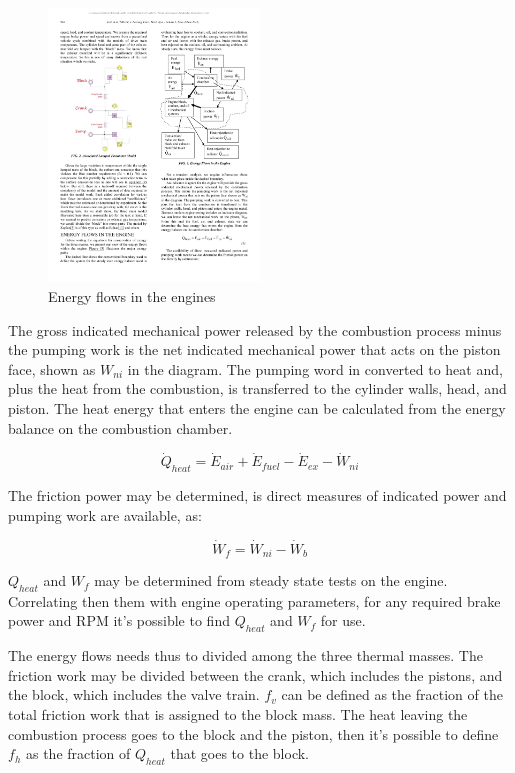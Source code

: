 \begin{figure}[ht]
  \centering
  \includegraphics[width=0.5\textwidth]{figures/model/energy_flows.pdf}
  \caption{Energy flows in the engines\label{fig:energy_flows} }
\end{figure}

The gross indicated mechanical power released by the combustion process minus the pumping work is the net indicated mechanical power that acts on the piston face, shown as $W_{ni}$ in the diagram. The pumping word in converted to heat and, plus the heat from the combustion, is transferred to the cylinder walls, head, and piston. The heat energy that enters the engine can be calculated from the energy balance on the combustion chamber.

\begin{equation}
  \dot{Q}_{heat} = \dot{E}_{air}+\dot{E}_{fuel}-\dot{E}_{ex}-\dot{W}_{ni}
\end{equation}

The friction power may be determined, is direct measures of indicated power and pumping work are available, as:

\begin{equation}
  \dot{W}_{f}=\dot{W}_{ni}-\dot{W}_{b}
\end{equation}

$Q_{heat}$ and $W_{f}$ may be determined from steady state tests on the engine. Correlating then them with engine operating parameters, for any required brake power and RPM it's possible to find $Q_{heat}$ and $W_{f}$ for use.

The energy flows needs thus to divided among the three thermal masses. The friction work may be divided between the crank, which includes the pistons, and the block, which includes the valve train. $f_{v}$ can be defined as the fraction of the total friction work that is assigned to the block mass. The heat leaving the combustion process goes to the block and the piston, then it's possible to define $f_{h}$ as the fraction of $Q_{heat}$ that goes to the block.


